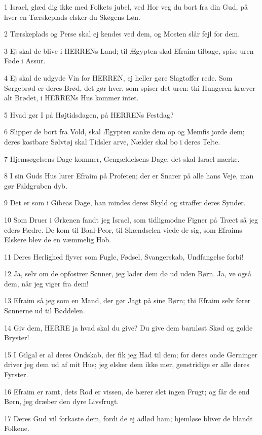 \par 1 Israel, glæd dig ikke med Folkets jubel, ved Hor veg du bort fra din Gud, på hver en Tærskeplads elsker du Skøgens Løn.
\par 2 Tærskeplads og Perse skal ej kendes ved dem, og Mosten slår fejl for dem.
\par 3 Ej skal de blive i HERRENs Land; til Ægypten skal Efraim tilbage, spise uren Føde i Assur.
\par 4 Ej skal de udgyde Vin for HERREN, ej heller gøre Slagtoffer rede. Som Sørgebrød er deres Brød, det gør hver, som spiser det uren: thi Hungeren kræver alt Brødet, i HERRENs Hus kommer intet.
\par 5 Hvad gør I på Højtidsdagen, på HERRENs Festdag?
\par 6 Slipper de bort fra Vold, skal Ægypten sanke dem op og Memfis jorde dem; deres kostbare Sølvtøj skal Tidsler arve, Nælder skal bo i deres Telte.
\par 7 Hjemsøgelsens Dage kommer, Gengældelsens Dage, det skal Israel mærke.
\par 8 I sin Guds Hus lurer Efraim på Profeten; der er Snarer på alle hans Veje, man gør Faldgruben dyb.
\par 9 Det er som i Gibeas Dage, han mindes deres Skyld og straffer deres Synder.
\par 10 Som Druer i Ørkenen fandt jeg Israel, som tidligmodne Figner på Træet så jeg eders Fædre. De kom til Baal-Peor, til Skændselen viede de sig, som Efraims Elskere blev de en væmmelig Hob.
\par 11 Deres Herlighed flyver som Fugle, Fødsel, Svangerskab, Undfangelse forbi!
\par 12 Ja, selv om de opfostrer Sønner, jeg lader dem dø ud uden Børn. Ja, ve også dem, når jeg viger fra dem!
\par 13 Efraim så jeg som en Mand, der gør Jagt på sine Børn; thi Efraim selv fører Sønnerne ud til Bøddelen.
\par 14 Giv dem, HERRE ja hvad skal du give? Du give dem barnløst Skød og golde Bryster!
\par 15 I Gilgal er al deres Ondskab, der fik jeg Had til dem; for deres onde Gerninger driver jeg dem ud af mit Hus; jeg elsker dem ikke mer, genstridige er alle deres Fyrster.
\par 16 Efraim er ramt, dets Rod er vissen, de bærer slet ingen Frugt; og får de end Børn, jeg dræber den dyre Livsfrugt.
\par 17 Deres Gud vil forkaste dem, fordi de ej adlød ham; hjemløse bliver de blandt Folkene.

